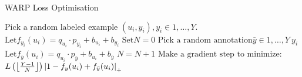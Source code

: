 \begin{algorithm}
\caption{WARP Loss Optimisation} \label{WARP}
\begin{algorithmic}[1]
	\Repeat
	\State $\text{Pick a random labeled example }(u_i, y_i), y_i \in {1, \ldots, Y}.$
	\State $\text{Let} f_{y_i}(u_i) = q_{u_i} \cdot p_{y_i} + b_{u_i} + b_{y_i}$
	\State $\text{Set} N = 0$
	\Repeat
		\State $\text{Pick a random annotation} \bar{y} \in {1, \ldots, Y} \ y_i$
		\State $\text{Let} f_{\bar{y}} (u_i) = q_{u_i} \cdot p_{\bar{y}} + b_{u_i} + b_{\bar{y}}$
		\State $N = N + 1$
		\State $\text{Make a gradient step to minimize:}$
		\State $L \left( \floor*{\frac{Y-1}{N}} \right) {\lvert 1 - f_y(u_i) + f_{\bar{y}} (u_i) \rvert}_+$	
	\EndIf
\EndFunction
\end{algorithmic}
\end{algorithm}
